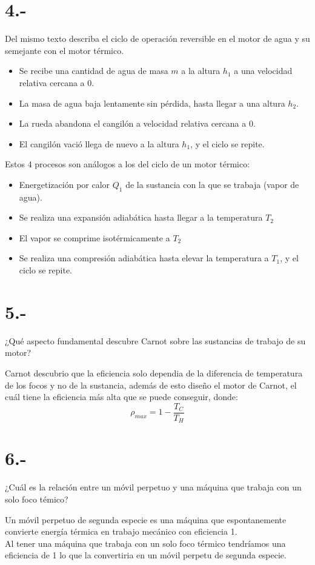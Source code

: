 \documentclass{article}
\begin{document}
\section*{4.-}
Del mismo texto describa el ciclo de operación reversible en el motor de agua y su semejante con el motor térmico.
\begin{tcolorbox}[breakable]
    \begin{itemize}
        \item Se recibe una cantidad de agua de masa $m$ a la altura $h_1$ a una velocidad relativa cercana a $0$.
        \item La masa de agua baja lentamente sin pérdida, hasta llegar a una altura $h_2$.
        \item La rueda abandona el cangilón a velocidad relativa cercana a $0$.
        \item El cangilón vació llega de nuevo a la altura $h_1$, y el ciclo se repite.
    \end{itemize}
    Estos 4 procesos son análogos a los del ciclo de un motor térmico:
    \begin{itemize}
        \item Energetización por calor $Q_1$ de la sustancia con la que se trabaja (vapor de agua).
        \item Se realiza una expansión adiabática hasta llegar a la temperatura $T_2$
        \item El vapor se comprime isotérmicamente a $T_2$ 
        \item Se realiza una compresión adiabática hasta elevar la temperatura a $T_1$, y el ciclo se repite.   
    \end{itemize}
\end{tcolorbox}

\section*{5.-}
¿Qué aspecto fundamental descubre Carnot sobre las sustancias de trabajo de su motor?
\begin{tcolorbox}[breakable]
    Carnot descubrio que la eficiencia solo dependia de la diferencia de temperatura de los focos y no de la sustancia, 
    además de esto diseño el motor de Carnot, el cuál tiene la eficiencia más alta que se puede conseguir, donde:
    \[ \rho_{max} = 1 - \frac{T_C}{T_H} \]
\end{tcolorbox}

\section*{6.-}
¿Cuál es la relación entre un móvil perpetuo y una máquina que trabaja con un solo foco témico?
\begin{tcolorbox}[breakable]
    Un móvil perpetuo de segunda especie es una máquina que espontanemente convierte energía térmica en trabajo mecánico con eficiencia 1. \\
    Al tener una máquina que trabaja con un solo foco térmico tendríamos una eficiencia de 1 lo que la convertiria en un móvil perpetu de segunda especie.
\end{tcolorbox}
\end{document}
